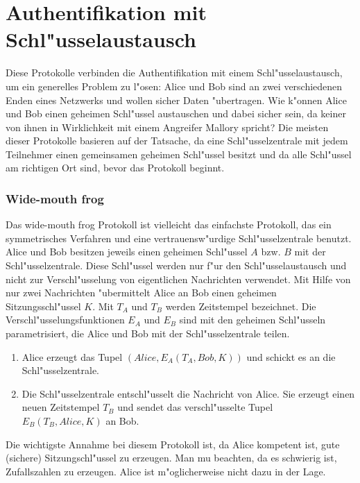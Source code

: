
\section{Authentifikation mit Schl"usselaustausch}

Diese Protokolle verbinden die Authentifikation mit einem
Schl"usselaustausch, um ein generelles Problem zu l"osen: Alice und
Bob sind an zwei verschiedenen Enden eines Netzwerks und wollen sicher
Daten "ubertragen. Wie k"onnen Alice und Bob einen geheimen Schl"ussel
austauschen und dabei sicher sein, da\3 keiner von ihnen in
Wirklichkeit mit einem Angreifer Mallory spricht? Die meisten dieser
Protokolle basieren auf der Tatsache, da\3 eine Schl"usselzentrale mit
jedem Teilnehmer einen gemeinsamen geheimen Schl"ussel besitzt und
da\3 alle Schl"ussel am richtigen Ort sind, bevor das Protokoll
beginnt.


\subsubsection*{Wide-mouth frog}

Das wide-mouth frog Protokoll ist vielleicht das einfachste Protokoll,
das ein symmetrisches Verfahren und eine vertrauensw"urdige
Schl"usselzentrale benutzt.  Alice und Bob besitzen jeweils einen
geheimen Schl"ussel $A$ bzw. $B$ mit der Schl"usselzentrale. Diese
Schl"ussel werden nur f"ur den Schl"usselaustausch und nicht zur
Verschl"usselung von eigentlichen Nachrichten verwendet. Mit Hilfe von
nur zwei Nachrichten "ubermittelt Alice an Bob einen geheimen
Sitzungsschl"ussel $K$.  Mit $T_A$ und $T_B$ werden Zeitstempel
bezeichnet. Die Verschl"usselungsfunktionen $E_A$ und $E_B$ sind mit
den geheimen Schl"usseln parametrisiert, die Alice und Bob mit der
Schl"usselzentrale teilen.
\begin{enumerate}
  \item Alice erzeugt das Tupel $(Alice,E_A(T_A,Bob,K))$ und schickt es an
        die Schl"us\-sel\-zen\-trale.
  \item Die Schl"usselzentrale entschl"usselt die Nachricht von
        Alice. Sie erzeugt einen neuen Zeitstempel $T_B$ und sendet das
        verschl"usselte Tupel $E_B(T_B,Alice,K)$ an Bob.
\end{enumerate}
Die wichtigste Annahme bei diesem Protokoll ist, da\3 Alice kompetent
ist, gute (sichere) Sitzungschl"ussel zu erzeugen. Man mu\3 beachten,
da\3 es schwierig ist, Zufallszahlen zu erzeugen. Alice ist
m"oglicherweise nicht dazu in der Lage.

